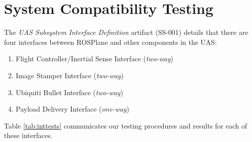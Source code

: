 \documentclass[]{auvsi_doc}
\begin{document}
\section{System Compatibility Testing}

The \textit{UAS Subsystem Interface Definition} artifact (SS-001) details that there are four interfaces between ROSPlane and other components in the UAS:

\begin{enumerate}
	\item Flight Controller/Inertial Sense Interface (\textit{two-way})
	\item Image Stamper Interface (\textit{two-way})
	\item Ubiquiti Bullet Interface (\textit{two-way})
	\item Payload Delivery Interface (\textit{one-way})
\end{enumerate}

Table \ref{tab:inttests} communicates our testing procedures and results for each of these interfaces.
\end{document}
